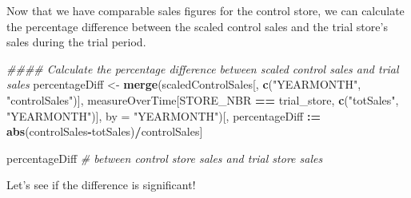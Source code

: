 \documentclass[
]{article}
\newenvironment{Shaded}{\begin{snugshade}}{\end{snugshade}}
\newcommand{\CommentTok}[1]{\textcolor[rgb]{0.56,0.35,0.01}{\textit{#1}}}
\newcommand{\DataTypeTok}[1]{\textcolor[rgb]{0.13,0.29,0.53}{#1}}
\newcommand{\ErrorTok}[1]{\textcolor[rgb]{0.64,0.00,0.00}{\textbf{#1}}}
\newcommand{\KeywordTok}[1]{\textcolor[rgb]{0.13,0.29,0.53}{\textbf{#1}}}
\newcommand{\NormalTok}[1]{#1}
\newcommand{\OperatorTok}[1]{\textcolor[rgb]{0.81,0.36,0.00}{\textbf{#1}}}
\newcommand{\StringTok}[1]{\textcolor[rgb]{0.31,0.60,0.02}{#1}}
\begin{document}
Now that we have comparable sales figures for the control store, we can
calculate the percentage difference between the scaled control sales and
the trial store's sales during the trial period.

\begin{Shaded}
\begin{Highlighting}[]
\CommentTok{#### Calculate the percentage difference between scaled control sales and trial sales}
\NormalTok{percentageDiff <-}\StringTok{ }\KeywordTok{merge}\NormalTok{(scaledControlSales[, }\KeywordTok{c}\NormalTok{(}\StringTok{"YEARMONTH"}\NormalTok{, }\StringTok{"controlSales"}\NormalTok{)],}
\NormalTok{                        measureOverTime[STORE_NBR }\OperatorTok{==}\StringTok{ }\NormalTok{trial_store, }\KeywordTok{c}\NormalTok{(}\StringTok{"totSales"}\NormalTok{, }\StringTok{"YEARMONTH"}\NormalTok{)],}
                        \DataTypeTok{by =} \StringTok{"YEARMONTH"}\NormalTok{)[, percentageDiff }\OperatorTok{:}\ErrorTok{=}\StringTok{ }\KeywordTok{abs}\NormalTok{(controlSales}\OperatorTok{-}\NormalTok{totSales)}\OperatorTok{/}\NormalTok{controlSales]}
\end{Highlighting}
\end{Shaded}

\begin{Shaded}
\begin{Highlighting}[]
\NormalTok{percentageDiff }\CommentTok{# between control store sales and trial store sales}
\end{Highlighting}
\end{Shaded}

Let's see if the difference is significant!
\end{document}
